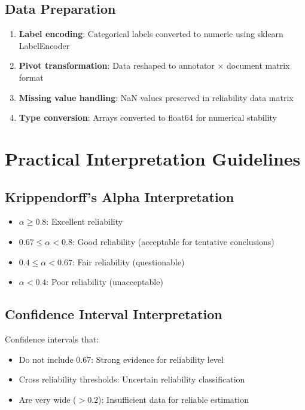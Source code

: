 \documentclass[11pt]{article}
\begin{document}
\subsection{Data Preparation}

\begin{enumerate}
\item \textbf{Label encoding}: Categorical labels converted to numeric using sklearn LabelEncoder
\item \textbf{Pivot transformation}: Data reshaped to annotator × document matrix format
\item \textbf{Missing value handling}: NaN values preserved in reliability data matrix
\item \textbf{Type conversion}: Arrays converted to float64 for numerical stability
\end{enumerate}

\section{Practical Interpretation Guidelines}

\subsection{Krippendorff's Alpha Interpretation}

\begin{itemize}
\item $\alpha \geq 0.8$: Excellent reliability
\item $0.67 \leq \alpha < 0.8$: Good reliability (acceptable for tentative conclusions)
\item $0.4 \leq \alpha < 0.67$: Fair reliability (questionable)
\item $\alpha < 0.4$: Poor reliability (unacceptable)
\end{itemize}

\subsection{Confidence Interval Interpretation}

Confidence intervals that:
\begin{itemize}
\item Do not include 0.67: Strong evidence for reliability level
\item Cross reliability thresholds: Uncertain reliability classification
\item Are very wide ($> 0.2$): Insufficient data for reliable estimation
\end{itemize}
\end{document}
